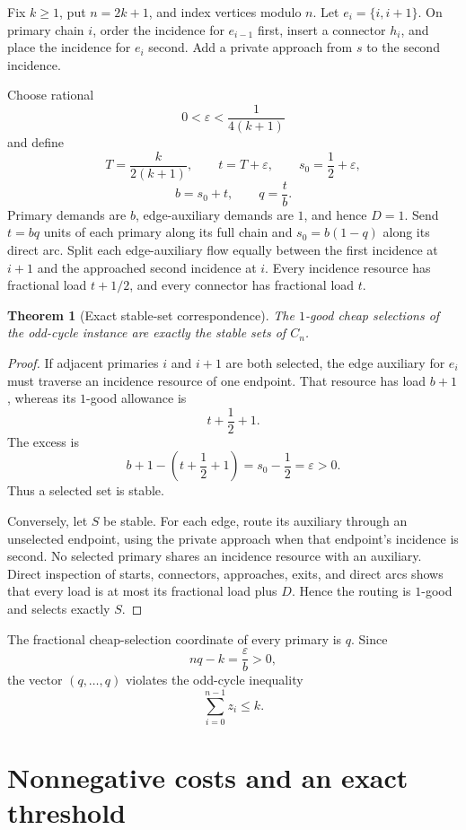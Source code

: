\documentclass[11pt]{article}
\newtheorem{theorem}{Theorem}
\theoremstyle{definition}
\begin{document}
Fix \(k\ge1\), put \(n=2k+1\), and index vertices modulo \(n\). Let \(e_i=\{i,i+1\}\). On primary chain \(i\), order the incidence for \(e_{i-1}\) first, insert a connector \(h_i\), and place the incidence for \(e_i\) second. Add a private approach from \(s\) to the second incidence.

Choose rational
\[
0<\varepsilon<\frac1{4(k+1)}
\]
and define
\[
T=\frac{k}{2(k+1)},\qquad
t=T+\varepsilon,\qquad
s_0=\frac12+\varepsilon,
\]
\[
b=s_0+t,\qquad q=\frac{t}{b}.
\]
Primary demands are \(b\), edge-auxiliary demands are \(1\), and hence \(D=1\). Send \(t=bq\) units of each primary along its full chain and \(s_0=b(1-q)\) along its direct arc. Split each edge-auxiliary flow equally between the first incidence at \(i+1\) and the approached second incidence at \(i\). Every incidence resource has fractional load \(t+1/2\), and every connector has fractional load \(t\).

\begin{theorem}[Exact stable-set correspondence]\label{thm:cycle}
The \(1\)-good cheap selections of the odd-cycle instance are exactly the stable sets of \(C_n\).
\end{theorem}

\begin{proof}
If adjacent primaries \(i\) and \(i+1\) are both selected, the edge auxiliary for \(e_i\) must traverse an incidence resource of one endpoint. That resource has load \(b+1\), whereas its \(1\)-good allowance is
\[
t+\frac12+1.
\]
The excess is
\[
b+1-\left(t+\frac12+1\right)
=s_0-\frac12
=\varepsilon>0.
\]
Thus a selected set is stable.

Conversely, let \(S\) be stable. For each edge, route its auxiliary through an unselected endpoint, using the private approach when that endpoint's incidence is second. No selected primary shares an incidence resource with an auxiliary. Direct inspection of starts, connectors, approaches, exits, and direct arcs shows that every load is at most its fractional load plus \(D\). Hence the routing is \(1\)-good and selects exactly \(S\).
\end{proof}

The fractional cheap-selection coordinate of every primary is \(q\). Since
\begin{equation}\label{eq:violation}
nq-k=\frac{\varepsilon}{b}>0,
\end{equation}
the vector \((q,\ldots,q)\) violates the odd-cycle inequality
\[
\sum_{i=0}^{n-1}z_i\le k.
\]

\section{Nonnegative costs and an exact threshold}\label{sec:threshold}
\end{document}
